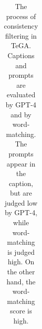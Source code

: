 \begin{table}[ht]
\begin{tabular}{@{}p{2.5cm}p{12cm}@{}}
        \bottomrule
    \end{tabular}
    \caption{The process of consistency filtering in TeGA. Captions and prompts are evaluated by GPT-4 and by word-matching. The prompts appear in the caption, but are judged low by GPT-4, while word-matching is judged high. On the other hand, the word-matching score is high.}
    \label{tab:prompt_examples_failed_total_ok}
\end{table}


